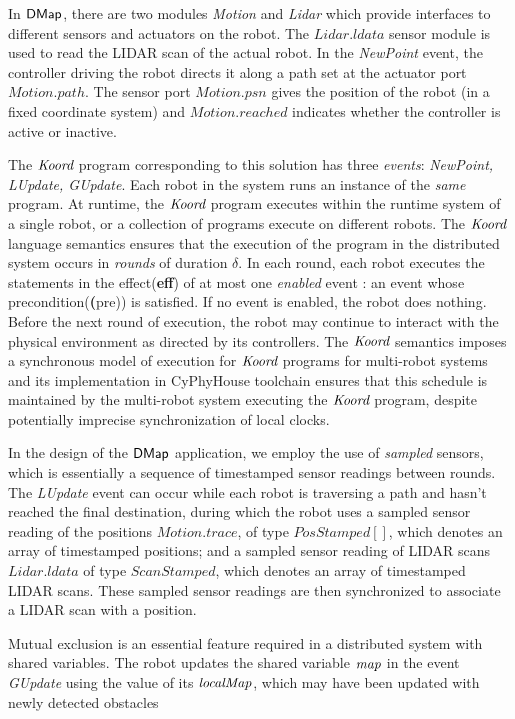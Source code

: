 In ${\sf DMap}$, there are two modules \emph{Motion} and \emph{Lidar} which provide interfaces to different sensors and actuators on the robot. The $\mathit{Lidar.ldata}$ sensor module is used to read the LIDAR scan of the actual robot. In the \emph{NewPoint} event, the controller driving the robot directs it along a path set at the actuator port $\mathit{Motion.path}$. The sensor port $\mathit{Motion.psn}$ gives the position of the robot (in a fixed coordinate system) and $\mathit{Motion.reached}$ indicates whether the controller is active or inactive.

The $\emph{Koord}$ program corresponding to this solution has three \emph{events}: \emph{NewPoint, LUpdate, GUpdate}. Each robot in the system runs an instance of the \emph{same} program. At runtime, the $\emph{Koord}$ program executes within the runtime system of a single robot, or a collection of programs execute on different robots. The $\emph{Koord}$ language semantics ensures that the execution of the program in the distributed system occurs in \emph{rounds} of duration $\delta$. In each round, each robot executes the statements in the effect(\textbf{eff}) of at most one \emph{enabled} event : an event whose precondition(\textbf(pre)) is satisfied. If no event is enabled, the robot does nothing. Before the next round of execution, the robot may continue to interact with the physical environment as directed by its controllers. The $\emph{Koord}$ semantics imposes a synchronous model of execution for $\emph{Koord}$ programs for multi-robot systems and its implementation in CyPhyHouse toolchain ensures that this schedule is maintained by the multi-robot system executing the $\emph{Koord}$ program, despite potentially imprecise synchronization of local clocks.

In the design of the ${\sf DMap}$ application, we employ the use of \emph{sampled} sensors, which is essentially a sequence of timestamped sensor readings between rounds. The \emph{LUpdate} event can occur while each robot is traversing a path and hasn't reached the final destination, during which the robot uses a sampled sensor reading of the positions $\mathit{Motion.trace}$, of type $\mathit{PosStamped}[]$, which denotes an array of timestamped positions; and a sampled sensor reading of LIDAR scans $\mathit{Lidar.ldata}$ of type $\mathit{ScanStamped}$, which denotes an array of timestamped LIDAR scans. These sampled sensor readings are then synchronized to associate a LIDAR scan with a position.

Mutual exclusion is an essential feature required in a distributed system with shared variables. The robot updates the shared variable $\mathit{map}$ in the event \emph{GUpdate} using the value of its $\mathit{localMap}$, which may have been updated with newly detected obstacles



